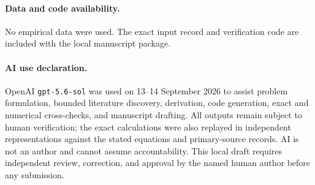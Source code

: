 \documentclass[11pt]{article}
\begin{document}
\paragraph{Data and code availability.} No empirical data were used.  The exact input
record and verification code are included with the local manuscript package.

\paragraph{AI use declaration.} OpenAI \texttt{gpt-5.6-sol} was used on
13--14 September 2026 to assist problem formulation, bounded literature discovery,
derivation, code generation, exact and numerical cross-checks, and manuscript drafting.
All outputs remain subject to human verification; the exact calculations were also
replayed in independent representations against the stated equations and primary-source
records.  AI is not an author and cannot assume accountability.  This local draft
requires independent review, correction, and approval by the named human author before
any submission.



\end{document}
